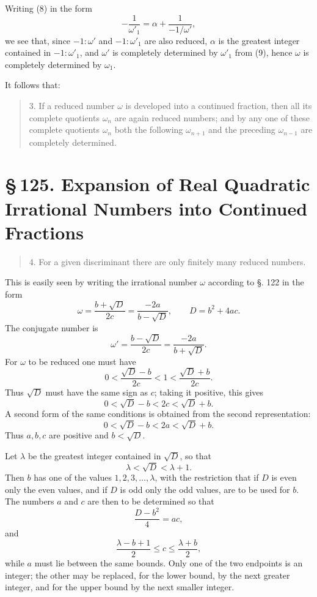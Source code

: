 \documentclass[11pt]{article}
\providecommand{\sect}[2]{\section*{\S\,#1. #2}}
\begin{document}
Writing (8) in the form
\[
\tag{9}        -\frac1{\omega'_1}=\alpha+\frac1{-1/\omega'},
\]
we see that, since $-1:\omega'$ and $-1:\omega'_1$ are also reduced, $\alpha$ is the greatest integer contained in $-1:\omega'_1$, and $\omega'$ is completely determined by $\omega'_1$ from (9), hence $\omega$ is completely determined by $\omega_1$.

It follows that:
\begin{quote}
3. If a reduced number $\omega$ is developed into a continued fraction, then all its complete quotients $\omega_n$ are again reduced numbers; and by any one of these complete quotients $\omega_n$ both the following $\omega_{n+1}$ and the preceding $\omega_{n-1}$ are completely determined.
\end{quote}

\sect{125}{Expansion of Real Quadratic Irrational Numbers into Continued Fractions}

\begin{quote}
4. For a given discriminant there are only finitely many reduced numbers.
\end{quote}

This is easily seen by writing the irrational number $\omega$ according to §. 122 in the form
\[
\tag{1}        \omega=\frac{b+\sqrt D}{2c}
=\frac{-2a}{b-\sqrt D},\qquad D=b^2+4ac.
\]
The conjugate number is
\[
\tag{2}        \omega'=\frac{b-\sqrt D}{2c}
=\frac{-2a}{b+\sqrt D}.
\]
For $\omega$ to be reduced one must have
\[
\tag{3}        0<\frac{\sqrt D-b}{2c}<1<\frac{\sqrt D+b}{2c}.
\]
Thus $\sqrt D$ must have the same sign as $c$; taking it positive, this gives
\[
\tag{4}        0<\sqrt D-b<2c<\sqrt D+b.
\]
A second form of the same conditions is obtained from the second representation:
\[
\tag{5}        0<\sqrt D-b<2a<\sqrt D+b.
\]
Thus $a,b,c$ are positive and $b<\sqrt D$.

Let $\lambda$ be the greatest integer contained in $\sqrt D$, so that
\[
        \lambda<\sqrt D<\lambda+1.
\]
Then $b$ has one of the values $1,2,3,\ldots,\lambda$, with the restriction that if $D$ is even only the even values, and if $D$ is odd only the odd values, are to be used for $b$. The numbers $a$ and $c$ are then to be determined so that
\[
\tag{6}        \frac{D-b^2}{4}=ac,
\]
and
\[
\tag{7}        \frac{\lambda-b+1}{2}\le c\le \frac{\lambda+b}{2},
\]
while $a$ must lie between the same bounds. Only one of the two endpoints is an integer; the other may be replaced, for the lower bound, by the next greater integer, and for the upper bound by the next smaller integer.
\end{document}
